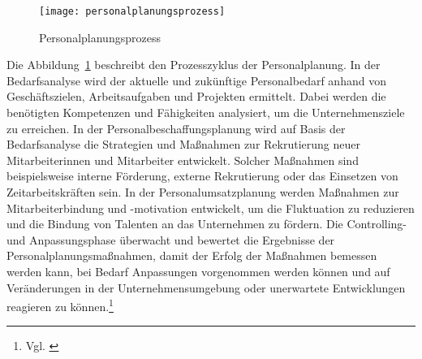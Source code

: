 \begin{figure}%
\centering
\texttt{[image: personalplanungsprozess]}
\caption{Personalplanungsprozess}
\label{fig:personalplanungsprozess}
\end{figure}

Die Abbildung~\ref{fig:personalplanungsprozess} beschreibt den Prozesszyklus der Personalplanung. In der Bedarfsanalyse wird der aktuelle und zukünftige Personalbedarf anhand von Geschäftszielen, Arbeitsaufgaben und Projekten ermittelt. Dabei werden die benötigten Kompetenzen und Fähigkeiten analysiert, um die Unternehmensziele zu erreichen. In der Personalbeschaffungsplanung wird auf Basis der Bedarfsanalyse die Strategien und Maßnahmen zur Rekrutierung neuer Mitarbeiterinnen und Mitarbeiter entwickelt. Solcher Maßnahmen sind beispielsweise interne Förderung, externe Rekrutierung oder das Einsetzen von Zeitarbeitskräften sein. In der Personalumsatzplanung werden Maßnahmen zur Mitarbeiterbindung und -motivation entwickelt, um die Fluktuation zu reduzieren und die Bindung von Talenten an das Unternehmen zu fördern. Die Controlling- und Anpassungsphase überwacht und bewertet die Ergebnisse der Personalplanungsmaßnahmen, damit der Erfolg der Maßnahmen bemessen werden kann, bei Bedarf Anpassungen vorgenommen werden können und auf Veränderungen in der Unternehmensumgebung oder unerwartete Entwicklungen reagieren zu können.\footnote{Vgl. \cite{bwllexikon2024}}

